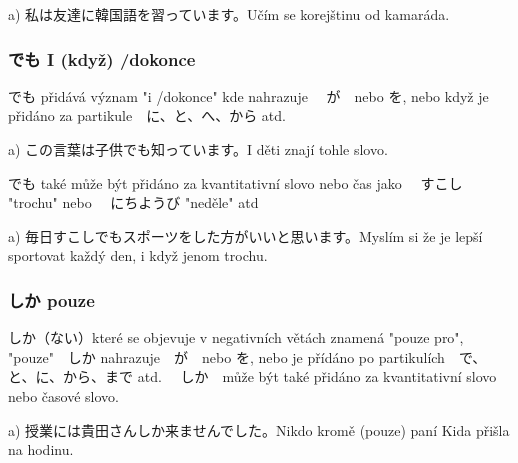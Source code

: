 a) 私は友達に韓国語を習っています。Učím se korejštinu od kamaráda.

\subsubsection{でも I (když) /dokonce}
でも přidává význam "i /dokonce" kde nahrazuje 　が　nebo を, nebo když je přidáno za partikule　に、と、へ、から atd.

a) この言葉は子供でも知っています。I děti znají tohle slovo.

でも také může být přidáno za kvantitativní slovo nebo čas jako 　すこし "trochu" nebo 　にちようび "neděle" atd

a) 毎日すこしでもスポーツをした方がいいと思います。Myslím si že je lepší sportovat každý den, i když jenom trochu.

\subsubsection{しか pouze}

しか（ない）které se objevuje v negativních větách znamená "pouze pro", "pouze"　しか nahrazuje　が　nebo を, nebo je přídáno po partikulích　で、と、に、から、まで atd. 　しか　může být také přidáno za kvantitativní slovo nebo časové slovo.

a) 授業には貴田さんしか来ませんでした。Nikdo kromě (pouze) paní Kida přišla na hodinu.






































